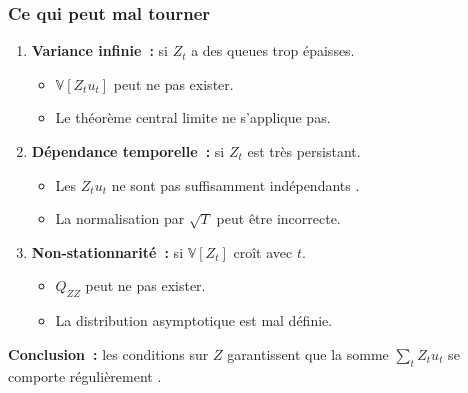 \documentclass[10pt]{beamer}
\begin{document}
\begin{frame}
  \frametitle{Ce qui peut mal tourner}

  \begin{enumerate}

  \item \textbf{Variance infinie~:} si $Z_t$ a des queues trop épaisses.
    \begin{itemize}
    \item $\mathbb V[Z_t u_t]$ peut ne pas exister.
    \item Le théorème central limite ne s'applique pas.
    \end{itemize}

    \medskip

  \item \textbf{Dépendance temporelle~:} si $Z_t$ est très persistant.
    \begin{itemize}
    \item Les $Z_t u_t$ ne sont pas \guillemotleft suffisamment indépendants \guillemotright{}.
    \item La normalisation par $\sqrt{T}$ peut être incorrecte.
    \end{itemize}

    \medskip

  \item \textbf{Non-stationnarité~:} si $\mathbb V[Z_t]$ croît avec $t$.
    \begin{itemize}
    \item $Q_{ZZ}$ peut ne pas exister.
    \item La distribution asymptotique est mal définie.
    \end{itemize}

  \end{enumerate}

  \medskip

  \textbf{Conclusion~:} les conditions sur $Z$ garantissent que la somme
  $\sum_t Z_t u_t$ se comporte \guillemotleft régulièrement \guillemotright{}.

\end{frame}
\end{document}
